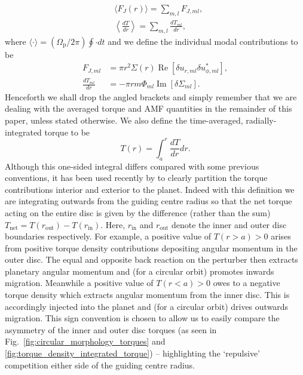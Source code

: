 %
\begin{align}
    & \langle F_{J}(r) \rangle = \sum_{m,l} F_{J, ml}, \\
    &\left\langle \frac{dT}{dr} \right\rangle = \sum_{m,l} \frac{dT_{ml}}{dr} ,
\end{align}
%
where $\langle\cdot\rangle = (\Omega_\textrm{p}/2\pi)\oint\cdot dt$ and we define the individual modal contributions to be
%
\begin{align}
    \label{eq:F_jml}
    F_{J, ml} & = \pi r^2 \Sigma(r) \operatorname{Re}[\delta u_{r, ml} \delta u_{\phi, ml}^{*}], \\
    \label{eq:dTdr_jml}
    \frac{dT_{ml}}{dr} &= -\pi r m \Phi_{ml} \operatorname{Im} [\delta \Sigma_{ml}].
\end{align}
%
Henceforth we shall drop the angled brackets and simply remember that we are dealing with the averaged torque and AMF quantities in the remainder of this paper, unless stated otherwise. We also define the time-averaged, radially-integrated torque to be
%
\begin{equation}
    \label{eq:one_sided_torque}
    T(r) = \int_a^{r} \frac{dT}{dr} dr.
\end{equation}
%
Although this one-sided integral differs compared with some previous conventions, it has been used recently by \cite{CimermanEtAl_2024} to clearly partition the torque contributions interior and exterior to the planet. Indeed with this definition we are integrating outwards from the guiding centre radius so that the net torque acting on the entire disc is given by the difference (rather than the sum) $T_\textrm{net} = T(r_\textrm{out})-T(r_\textrm{in})$. Here, $r_\textrm{in}$ and $r_\textrm{out}$ denote the inner and outer disc boundaries respectively. For example, a positive value of $T(r>a) > 0$ arises from positive torque density contributions depositing angular momentum in the outer disc. The equal and opposite back reaction on the perturber then extracts planetary angular momentum and (for a circular orbit) promotes inwards migration. Meanwhile a positive value of $T(r<a) > 0$ owes to a negative torque density which extracts angular momentum from the inner disc. This is accordingly injected into the planet and (for a circular orbit) drives outwards migration. This sign convention is chosen to allow us to easily compare the asymmetry of the inner and outer disc torques (as seen in Fig.~\ref{fig:circular_morphology_torques} and \ref{fig:torque_density_integrated_torque}) -- highlighting the `repulsive' competition either side of the guiding centre radius.

